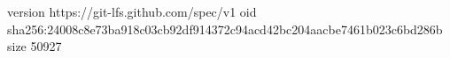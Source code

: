 version https://git-lfs.github.com/spec/v1
oid sha256:24008c8e73ba918c03cb92df914372c94acd42bc204aacbe7461b023c6bd286b
size 50927
